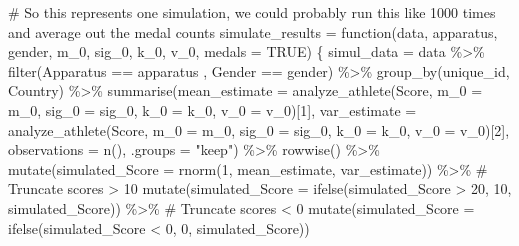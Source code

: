 \documentclass[
  letterpaper,
  DIV=11,
  numbers=noendperiod]{scrartcl}
\newenvironment{Shaded}{\begin{snugshade}}{\end{snugshade}}
\newcommand{\AttributeTok}[1]{\textcolor[rgb]{0.40,0.45,0.13}{#1}}
\newcommand{\CommentTok}[1]{\textcolor[rgb]{0.37,0.37,0.37}{#1}}
\newcommand{\ConstantTok}[1]{\textcolor[rgb]{0.56,0.35,0.01}{#1}}
\newcommand{\ControlFlowTok}[1]{\textcolor[rgb]{0.00,0.23,0.31}{#1}}
\newcommand{\DecValTok}[1]{\textcolor[rgb]{0.68,0.00,0.00}{#1}}
\newcommand{\FunctionTok}[1]{\textcolor[rgb]{0.28,0.35,0.67}{#1}}
\newcommand{\NormalTok}[1]{\textcolor[rgb]{0.00,0.23,0.31}{#1}}
\newcommand{\OtherTok}[1]{\textcolor[rgb]{0.00,0.23,0.31}{#1}}
\newcommand{\SpecialCharTok}[1]{\textcolor[rgb]{0.37,0.37,0.37}{#1}}
\newcommand{\StringTok}[1]{\textcolor[rgb]{0.13,0.47,0.30}{#1}}
\begin{document}
\begin{Shaded}
\begin{Highlighting}[]
\CommentTok{\# So this represents one simulation, we could probably run this like 1000 times and average out the medal counts}
\NormalTok{simulate\_results }\OtherTok{=} \ControlFlowTok{function}\NormalTok{(data, apparatus, gender, m\_0, sig\_0, k\_0, v\_0, }\AttributeTok{medals =} \ConstantTok{TRUE}\NormalTok{) \{}
\NormalTok{  simul\_data }\OtherTok{=}\NormalTok{ data }\SpecialCharTok{\%\textgreater{}\%}
    \FunctionTok{filter}\NormalTok{(Apparatus }\SpecialCharTok{==}\NormalTok{ apparatus}
\NormalTok{           , Gender }\SpecialCharTok{==}\NormalTok{ gender) }\SpecialCharTok{\%\textgreater{}\%}
    \FunctionTok{group\_by}\NormalTok{(unique\_id, Country) }\SpecialCharTok{\%\textgreater{}\%}
    \FunctionTok{summarise}\NormalTok{(}\AttributeTok{mean\_estimate =} \FunctionTok{analyze\_athlete}\NormalTok{(Score, }\AttributeTok{m\_0 =}\NormalTok{ m\_0, }\AttributeTok{sig\_0 =}\NormalTok{ sig\_0, }\AttributeTok{k\_0 =}\NormalTok{ k\_0, }\AttributeTok{v\_0 =}\NormalTok{ v\_0)[}\DecValTok{1}\NormalTok{],}
              \AttributeTok{var\_estimate =} \FunctionTok{analyze\_athlete}\NormalTok{(Score, }\AttributeTok{m\_0 =}\NormalTok{ m\_0, }\AttributeTok{sig\_0 =}\NormalTok{ sig\_0, }\AttributeTok{k\_0 =}\NormalTok{ k\_0, }\AttributeTok{v\_0 =}\NormalTok{ v\_0)[}\DecValTok{2}\NormalTok{],}
              \AttributeTok{observations =} \FunctionTok{n}\NormalTok{(), }\AttributeTok{.groups =} \StringTok{"keep"}\NormalTok{) }\SpecialCharTok{\%\textgreater{}\%}
    \FunctionTok{rowwise}\NormalTok{() }\SpecialCharTok{\%\textgreater{}\%}
    \FunctionTok{mutate}\NormalTok{(}\AttributeTok{simulated\_Score =} \FunctionTok{rnorm}\NormalTok{(}\DecValTok{1}\NormalTok{, mean\_estimate, var\_estimate)) }\SpecialCharTok{\%\textgreater{}\%} \CommentTok{\# Truncate scores \textgreater{} 10}
    \FunctionTok{mutate}\NormalTok{(}\AttributeTok{simulated\_Score =} \FunctionTok{ifelse}\NormalTok{(simulated\_Score }\SpecialCharTok{\textgreater{}} \DecValTok{20}\NormalTok{, }\DecValTok{10}\NormalTok{, simulated\_Score)) }\SpecialCharTok{\%\textgreater{}\%} \CommentTok{\# Truncate scores \textless{} 0}
    \FunctionTok{mutate}\NormalTok{(}\AttributeTok{simulated\_Score =} \FunctionTok{ifelse}\NormalTok{(simulated\_Score }\SpecialCharTok{\textless{}} \DecValTok{0}\NormalTok{, }\DecValTok{0}\NormalTok{, simulated\_Score)) }
  

\end{Highlighting}
\end{Shaded}
\end{document}
